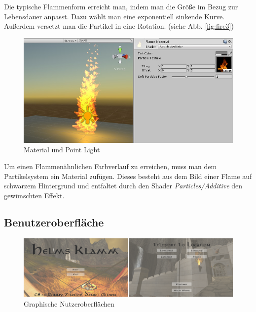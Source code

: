 Die typische Flammenform erreicht man, indem man die Größe im Bezug zur Lebensdauer anpasst. Dazu wählt man eine exponentiell sinkende Kurve. Außerdem versetzt man die Partikel in eine Rotation. (siehe Abb. \ref{fig:fire3})

\begin{figure}[h!]
\centering
\includegraphics[width=0.95\linewidth]{Abbildungen/Unity/Fire/fire4}
\caption{Material und Point Light}
\label{fig:fire4}
\end{figure}

Um einen Flammenähnlichen Farbverlauf zu erreichen, muss man dem Partikelsystem ein Material zufügen. Dieses besteht aus dem Bild einer Flame auf schwarzem Hintergrund und entfaltet durch den Shader \textit{Particles/Additive} den gewünschten Effekt.

\newpage

\subsection{Benutzeroberfläche}

\begin{figure}[h]
	\centering
	\includegraphics[width=0.95\linewidth]{Abbildungen/Unity/GuiCombined}
	\caption{Graphische Nutzeroberflächen}
	\label{fig:GuiCombined}
\end{figure}

%

